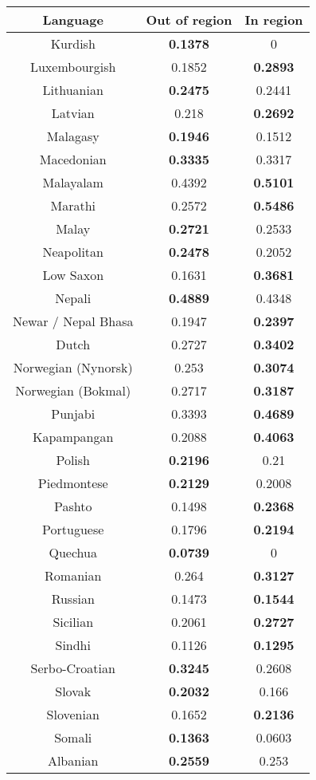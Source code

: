 \begin{figure}[h]
\begin{tabular}{ccc}\hline\hline
Language&Out of region&In region\\
\hline
Kurdish&\textbf{0.1378}&0\\
Luxembourgish&0.1852&\textbf{0.2893}\\
Lithuanian&\textbf{0.2475}&0.2441\\
Latvian&0.218&\textbf{0.2692}\\
Malagasy&\textbf{0.1946}&0.1512\\
Macedonian&\textbf{0.3335}&0.3317\\
Malayalam&0.4392&\textbf{0.5101}\\
Marathi&0.2572&\textbf{0.5486}\\
Malay&\textbf{0.2721}&0.2533\\
Neapolitan&\textbf{0.2478}&0.2052\\
Low Saxon&0.1631&\textbf{0.3681}\\
Nepali&\textbf{0.4889}&0.4348\\
Newar / Nepal Bhasa&0.1947&\textbf{0.2397}\\
Dutch&0.2727&\textbf{0.3402}\\
Norwegian (Nynorsk)&0.253&\textbf{0.3074}\\
Norwegian (Bokmal)&0.2717&\textbf{0.3187}\\
Punjabi&0.3393&\textbf{0.4689}\\
Kapampangan&0.2088&\textbf{0.4063}\\
Polish&\textbf{0.2196}&0.21\\
Piedmontese&\textbf{0.2129}&0.2008\\
Pashto&0.1498&\textbf{0.2368}\\
Portuguese&0.1796&\textbf{0.2194}\\
Quechua&\textbf{0.0739}&0\\
Romanian&0.264&\textbf{0.3127}\\
Russian&0.1473&\textbf{0.1544}\\
Sicilian&0.2061&\textbf{0.2727}\\
Sindhi&0.1126&\textbf{0.1295}\\
Serbo-Croatian&\textbf{0.3245}&0.2608\\
Slovak&\textbf{0.2032}&0.166\\
Slovenian&0.1652&\textbf{0.2136}\\
Somali&\textbf{0.1363}&0.0603\\
Albanian&\textbf{0.2559}&0.253\\

\end{tabular}
\end{figure}
